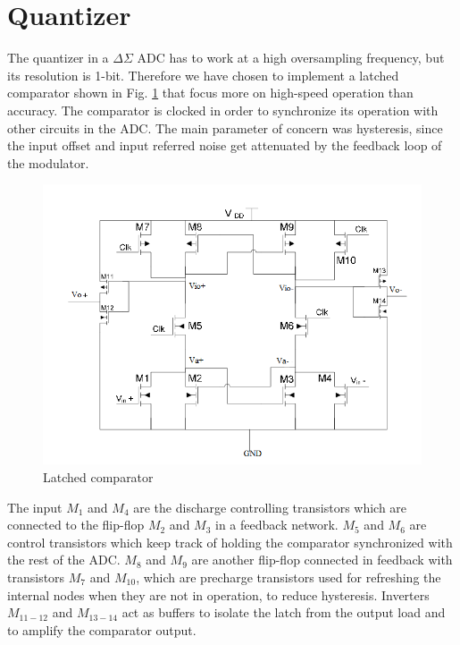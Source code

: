 \section{Quantizer}

The quantizer in a $\Delta\Sigma$ ADC has to work at a high oversampling frequency, but its resolution is 1-bit. Therefore we have chosen to implement a latched comparator\cite{comparator} shown in Fig. \ref{quantizer} that focus more on high-speed operation than accuracy. The comparator is clocked in order to synchronize its operation with other circuits in the ADC. The main parameter of concern was  hysteresis, since the input offset and input referred noise get attenuated by the feedback loop of the modulator. 

\begin{figure}[h]
\centering
\includegraphics[scale = 0.7]{images/quatizier_circuit.png}
\caption{Latched comparator\cite{comparator}}
\label{quantizer}
\end{figure}

The input $M_1$ and $M_4$ are the discharge controlling transistors which are connected to the flip-flop $M_2$ and $M_3$ in a feedback network. $M_5$ and $M_6$ are control transistors which keep track of holding the comparator synchronized with the rest of the ADC. $M_8$ and $M_9$ are another flip-flop connected in feedback with transistors $M_7$ and $M_{10}$, which are precharge transistors used for refreshing the internal nodes when they are not in operation, to reduce hysteresis. Inverters $M_{11-12}$ and $M_{13-14}$ act as buffers to isolate the latch from the output load and to amplify the comparator output.

